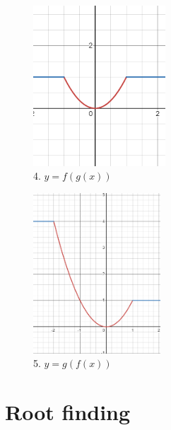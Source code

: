\documentclass[12pt]{article}
\begin{document}
\begin{figure}[h!]
\centering
\includegraphics[height=6cm]{4.png}
\captionsetup{labelformat=empty}
\caption{4. $y = f(g(x))$}
\end{figure}


\begin{figure}[h!]
\centering
\includegraphics[height=6cm]{5.png}
\captionsetup{labelformat=empty}
\caption{5. $y = g(f(x))$}
\end{figure}


\section{Root finding}
\end{document}
